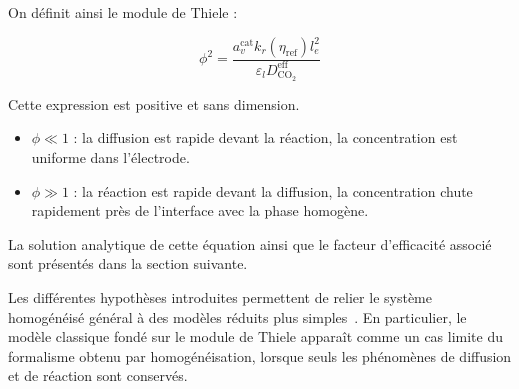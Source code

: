 On définit ainsi le module de Thiele :

\begin{equation}
\boxed{
\phi^2
=
\frac{
a_v^{\mathrm{cat}}
k_r(\eta_{\mathrm{ref}})
l_e^2
}{
\varepsilon_l
D_{\mathrm{CO_2}}^{\mathrm{eff}}
}
}
\end{equation}

Cette expression est positive et sans dimension.

\begin{itemize}
    \item $\phi \ll 1$ : la diffusion est rapide devant la réaction,
    la concentration est uniforme dans l'électrode.
    \item $\phi \gg 1$ : la réaction est rapide devant la diffusion,
    la concentration chute rapidement près de l'interface avec la phase homogène.
\end{itemize}

La solution analytique de cette équation ainsi que le facteur d'efficacité
associé sont présentés dans la section suivante.

\bigskip
Les différentes hypothèses introduites permettent de relier le système homogénéisé général à des modèles réduits
plus simples~\cite{dao3SimplificationOrder2012, schmidtUnderstandingDeviationsSpatially2021}. En particulier, le
 modèle classique fondé sur le module de Thiele apparaît comme un cas limite du formalisme obtenu par homogénéisation,
  lorsque seuls les phénomènes de diffusion et de réaction sont conservés.